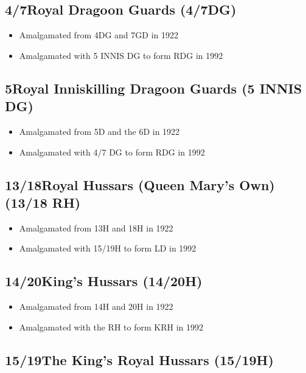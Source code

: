 \subsection*{4\th/7\nth Royal Dragoon Guards (4/7DG)}

\begin{itemize}
\item Amalgamated from 4DG and 7GD in 1922
\item Amalgamated with 5 INNIS DG to form RDG in 1992
\end{itemize}

\subsection*{5\nth Royal Inniskilling Dragoon Guards (5 INNIS DG)}

\begin{itemize}
\item Amalgamated from 5D and the 6D in 1922
\item Amalgamated with 4/7 DG to form RDG in 1992
\end{itemize}

\subsection*{13\th/18\nth Royal Hussars (Queen Mary's Own) (13/18 RH)}

\begin{itemize}
\item Amalgamated from 13H and 18H in 1922
\item Amalgamated with 15/19H to form LD in 1992
\end{itemize}

\subsection*{14\th/20\nth King's Hussars (14/20H)}

\begin{itemize}
\item Amalgamated from 14H and 20H in 1922
\item Amalgamated with the RH to form KRH in 1992
\end{itemize}

\subsection*{15\th/19\nth The King's Royal Hussars (15/19H)}

